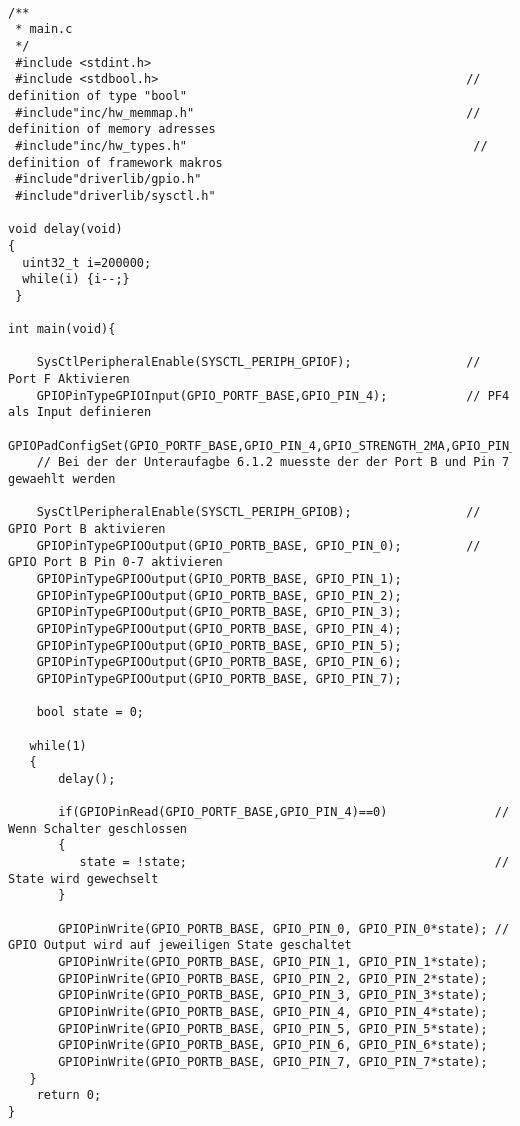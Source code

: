 \begin{lstlisting}

/**
 * main.c
 */
 #include <stdint.h>
 #include <stdbool.h>                                           // definition of type "bool"
 #include"inc/hw_memmap.h"                                      // definition of memory adresses
 #include"inc/hw_types.h"                                        // definition of framework makros
 #include"driverlib/gpio.h"
 #include"driverlib/sysctl.h"

void delay(void)
{
  uint32_t i=200000;
  while(i) {i--;}
 }

int main(void){

    SysCtlPeripheralEnable(SYSCTL_PERIPH_GPIOF);                // Port F Aktivieren
    GPIOPinTypeGPIOInput(GPIO_PORTF_BASE,GPIO_PIN_4);           // PF4 als Input definieren
    GPIOPadConfigSet(GPIO_PORTF_BASE,GPIO_PIN_4,GPIO_STRENGTH_2MA,GPIO_PIN_TYPE_STD_WPU);
    // Bei der der Unteraufagbe 6.1.2 muesste der der Port B und Pin 7 gewaehlt werden

    SysCtlPeripheralEnable(SYSCTL_PERIPH_GPIOB);                // GPIO Port B aktivieren
    GPIOPinTypeGPIOOutput(GPIO_PORTB_BASE, GPIO_PIN_0);         // GPIO Port B Pin 0-7 aktivieren
    GPIOPinTypeGPIOOutput(GPIO_PORTB_BASE, GPIO_PIN_1);
    GPIOPinTypeGPIOOutput(GPIO_PORTB_BASE, GPIO_PIN_2);
    GPIOPinTypeGPIOOutput(GPIO_PORTB_BASE, GPIO_PIN_3);
    GPIOPinTypeGPIOOutput(GPIO_PORTB_BASE, GPIO_PIN_4);
    GPIOPinTypeGPIOOutput(GPIO_PORTB_BASE, GPIO_PIN_5);
    GPIOPinTypeGPIOOutput(GPIO_PORTB_BASE, GPIO_PIN_6);
    GPIOPinTypeGPIOOutput(GPIO_PORTB_BASE, GPIO_PIN_7);

    bool state = 0;

   while(1)
   {
       delay();

       if(GPIOPinRead(GPIO_PORTF_BASE,GPIO_PIN_4)==0)               // Wenn Schalter geschlossen
       {
          state = !state;                                           // State wird gewechselt
       }

       GPIOPinWrite(GPIO_PORTB_BASE, GPIO_PIN_0, GPIO_PIN_0*state); // GPIO Output wird auf jeweiligen State geschaltet
       GPIOPinWrite(GPIO_PORTB_BASE, GPIO_PIN_1, GPIO_PIN_1*state);
       GPIOPinWrite(GPIO_PORTB_BASE, GPIO_PIN_2, GPIO_PIN_2*state);
       GPIOPinWrite(GPIO_PORTB_BASE, GPIO_PIN_3, GPIO_PIN_3*state);
       GPIOPinWrite(GPIO_PORTB_BASE, GPIO_PIN_4, GPIO_PIN_4*state);
       GPIOPinWrite(GPIO_PORTB_BASE, GPIO_PIN_5, GPIO_PIN_5*state);
       GPIOPinWrite(GPIO_PORTB_BASE, GPIO_PIN_6, GPIO_PIN_6*state);
       GPIOPinWrite(GPIO_PORTB_BASE, GPIO_PIN_7, GPIO_PIN_7*state);
   }
    return 0;
}
\end{lstlisting}


